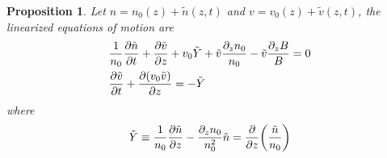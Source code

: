 \documentclass{article}
\theoremstyle{plain}
\newtheorem{proposition}{Proposition}
\theoremstyle{definition}
\theoremstyle{remark}
\theoremstyle{remark}
\begin{document}
\begin{proposition}
    Let $n = n_0(z) + \tilde{n}(z,t)$ and $v = v_0(z) + \tilde{v}(z,t)$, the linearized equations of motion are
    \begin{align}
        &\frac{1}{n_0}\pdv{\tilde{n}}{t} 
        + \pdv{\tilde{v}}{z} + v_0\tilde{Y} + \tilde{v}\frac{\partial_z n_0}{n_0} - \tilde{v}\frac{\partial_z B}{B} = 0 
        \label{eq:linearized-conservation-of-mass}
        \\
        &\pdv{\tilde{v}}{t} + \pdv{(v_0\tilde{v})}{z} = -\tilde{Y}
        \label{eq:linearized-conservation-of-momentum}
    \end{align}
    where 
    \[ \tilde{Y} \equiv \frac{1}{n_0}\pdv{\tilde{n}}{z} - \frac{\partial_z n_0}{n_0^2}\tilde{n} = \pdv{z}(\frac{\tilde{n}}{n_0}) \]
\end{proposition}
\end{document}

